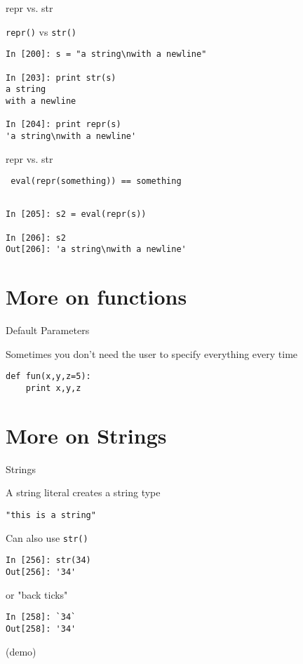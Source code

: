 \documentclass{beamer}
\begin{document}
\begin{frame}[fragile]{repr vs. str}

{\Large \verb|repr()| vs \verb|str()| }

\begin{verbatim}
In [200]: s = "a string\nwith a newline"

In [203]: print str(s)
a string
with a newline

In [204]: print repr(s)
'a string\nwith a newline'

\end{verbatim}

\end{frame}

\begin{frame}[fragile]{repr vs. str}


{\Large \verb| eval(repr(something)) == something | }

\begin{verbatim}

In [205]: s2 = eval(repr(s))

In [206]: s2
Out[206]: 'a string\nwith a newline'
\end{verbatim}

\end{frame}

\section{More on functions}

\begin{frame}[fragile]{Default Parameters}

 {\Large Sometimes you don't need the user to specify everything every time}

\begin{verbatim}
def fun(x,y,z=5):
    print x,y,z
\end{verbatim}

\end{frame} 


\section{More on Strings}

\begin{frame}[fragile]{Strings}

{\Large A string literal creates a string type}


\begin{verbatim}
"this is a string"
\end{verbatim}

{\Large Can also use \verb|str()|}

\begin{verbatim}
In [256]: str(34)
Out[256]: '34'
\end{verbatim}
{\Large or "back ticks"}
\begin{verbatim}
In [258]: `34`
Out[258]: '34'
\end{verbatim}
(demo)
\end{frame} 
\end{document}
